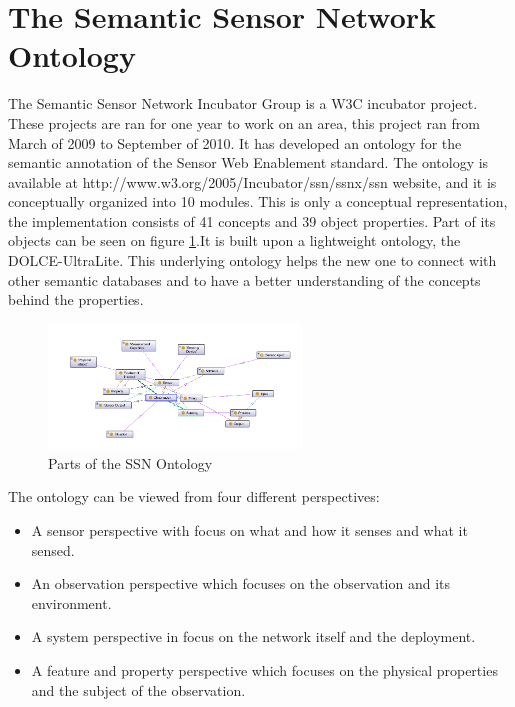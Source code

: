 \section{The Semantic Sensor Network Ontology}

The Semantic Sensor Network Incubator Group is a W3C incubator project. These projects are ran for one year to work on an area, this project ran from March of 2009 to September of 2010. It has developed an ontology for the semantic annotation of the Sensor Web Enablement standard. The ontology is available at http://www.w3.org/2005/Incubator/ssn/ssnx/ssn website, and it is conceptually organized into 10 modules. This is only a conceptual representation, the implementation consists of 41 concepts and 39 object properties. Part of its objects can be seen on figure \ref{fig:ssnopart}.It is built upon a lightweight ontology, the  DOLCE-UltraLite. This underlying ontology helps the new one to connect with other semantic databases and to have a better understanding of the concepts behind the properties. 


\begin{figure}[h]
\centering
\includegraphics[width=0.6\textwidth]{figures/ssnopart.png}
\caption{Parts of the SSN Ontology\label{fig:ssnopart}}
\end{figure}

The ontology can be viewed from four different perspectives:
\begin{itemize}
\item A sensor perspective with focus on what and how it senses and what it sensed.
\item An observation perspective which focuses on the observation and its environment.
\item A system perspective in focus on the network itself and the deployment.
\item A feature and property perspective which focuses on the physical properties and the subject of the observation. 
\end{itemize}